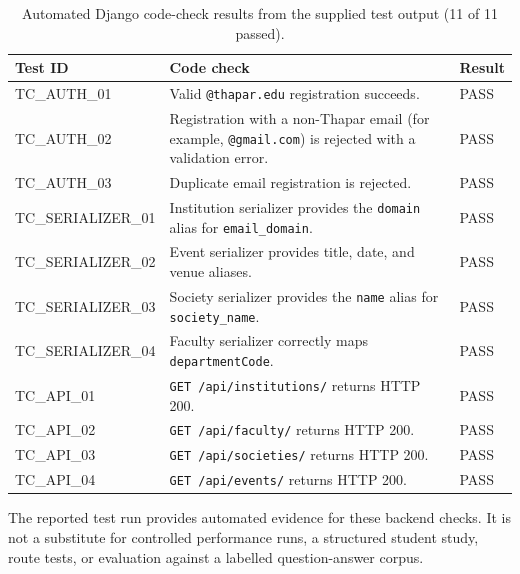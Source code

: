 \documentclass[11pt,a4paper]{report}
\begin{document}
\begin{table}[htbp]
\centering
\scriptsize
\begin{tabularx}{\linewidth}{@{}p{3.3cm}Yp{1.3cm}@{}}
\toprule
\textbf{Test ID} & \textbf{Code check} & \textbf{Result} \\
\midrule
TC\_AUTH\_01 & Valid \texttt{@thapar.edu} registration succeeds. & PASS \\
TC\_AUTH\_02 & Registration with a non-Thapar email (for example, \texttt{@gmail.com}) is rejected with a validation error. & PASS \\
TC\_AUTH\_03 & Duplicate email registration is rejected. & PASS \\
TC\_SERIALIZER\_01 & Institution serializer provides the \texttt{domain} alias for \texttt{email\_domain}. & PASS \\
TC\_SERIALIZER\_02 & Event serializer provides title, date, and venue aliases. & PASS \\
TC\_SERIALIZER\_03 & Society serializer provides the \texttt{name} alias for \texttt{society\_name}. & PASS \\
TC\_SERIALIZER\_04 & Faculty serializer correctly maps \texttt{departmentCode}. & PASS \\
TC\_API\_01 & \texttt{GET /api/institutions/} returns HTTP 200. & PASS \\
TC\_API\_02 & \texttt{GET /api/faculty/} returns HTTP 200. & PASS \\
TC\_API\_03 & \texttt{GET /api/societies/} returns HTTP 200. & PASS \\
TC\_API\_04 & \texttt{GET /api/events/} returns HTTP 200. & PASS \\
\bottomrule
\end{tabularx}
\caption{Automated Django code-check results from the supplied test output (11 of 11 passed).}
\label{tab:codecheck}
\end{table}

The reported test run provides automated evidence for these backend checks.
It is not a substitute for controlled performance runs, a structured student
study, route tests, or evaluation against a labelled question-answer corpus.
\end{document}
